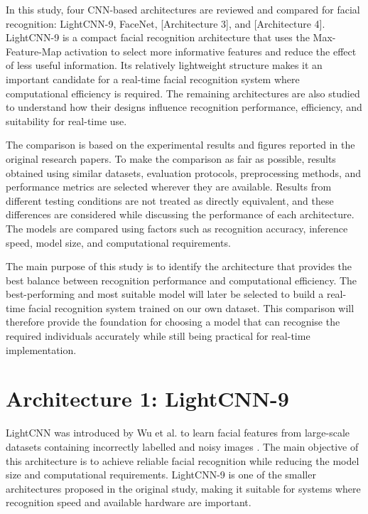 \documentclass[11pt,a4paper,twocolumn]{article}
\begin{document}
In this study, four CNN-based architectures are reviewed and compared for facial recognition: LightCNN-9, FaceNet, [Architecture 3], and [Architecture 4]. LightCNN-9 is a compact facial recognition architecture that uses the Max-Feature-Map activation to select more informative features and reduce the effect of less useful information. Its relatively lightweight structure makes it an important candidate for a real-time facial recognition system where computational efficiency is required. The remaining architectures are also studied to understand how their designs influence recognition performance, efficiency, and suitability for real-time use.

The comparison is based on the experimental results and figures reported in the original research papers. To make the comparison as fair as possible, results obtained using similar datasets, evaluation protocols, preprocessing methods, and performance metrics are selected wherever they are available. Results from different testing conditions are not treated as directly equivalent, and these differences are considered while discussing the performance of each architecture. The models are compared using factors such as recognition accuracy, inference speed, model size, and computational requirements.

The main purpose of this study is to identify the architecture that provides the best balance between recognition performance and computational efficiency. The best-performing and most suitable model will later be selected to build a real-time facial recognition system trained on our own dataset. This comparison will therefore provide the foundation for choosing a model that can recognise the required individuals accurately while still being practical for real-time implementation.



\section{Architecture 1: LightCNN-9}

LightCNN was introduced by Wu et al. to learn facial features from large-scale datasets containing incorrectly labelled and noisy images \cite{wu2018lightcnn}. The main objective of this architecture is to achieve reliable facial recognition while reducing the model size and computational requirements. LightCNN-9 is one of the smaller architectures proposed in the original study, making it suitable for systems where recognition speed and available hardware are important.
\end{document}
